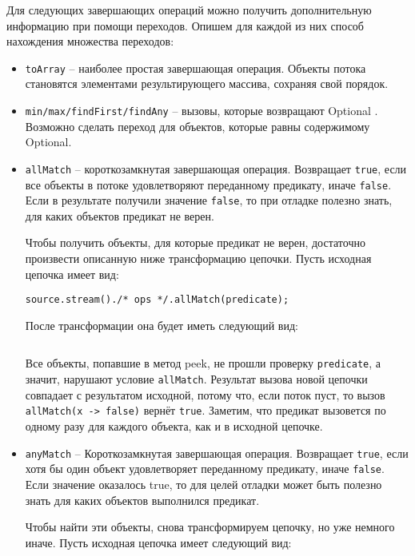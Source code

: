 Для следующих завершающих операций можно получить дополнительную информацию при помощи переходов. Опишем для каждой из них способ нахождения множества переходов:

\begin{itemize}
	\item \texttt{toArray} -- наиболее простая завершающая операция. Объекты потока становятся элементами результирующего массива, сохраняя свой порядок.
	\item \texttt{min/max/findFirst/findAny} -- вызовы, которые возвращают Optional \cite{java:optional}. Возможно сделать переход для объектов, которые равны содержимому Optional.
	\item \texttt{allMatch} -- короткозамкнутая завершающая операция. Возвращает \texttt{true}, если все объекты в потоке удовлетворяют переданному предикату, иначе \texttt{false}. Если в результате получили значение \texttt{false}, то при отладке полезно знать, для каких объектов предикат не верен.
	
	Чтобы получить объекты, для которые предикат не верен, достаточно произвести описанную ниже трансформацию цепочки. Пусть исходная цепочка имеет вид:
	
	\texttt{source.stream()./* ops */.allMatch(predicate);}

	После трансформации она будет иметь следующий вид:
	
	\inputminted{java}{chapter2/code/allMatchTransform.java}
	
	Все объекты, попавшие в метод peek, не прошли проверку \texttt{predicate}, а значит, нарушают условие \texttt{allMatch}. Результат вызова новой цепочки совпадает с результатом исходной, потому что, если поток пуст, то вызов \\ \texttt{allMatch(x -> false)} вернёт \texttt{true}. Заметим, что предикат вызовется по одному разу для каждого объекта, как и в исходной цепочке.
	
	\item \texttt{anyMatch} -- Короткозамкнутая завершающая операция. Возвращает \texttt{true}, если хотя бы один объект удовлетворяет переданному предикату, иначе \texttt{false}. Если значение оказалось true, то для целей отладки может быть полезно знать для каких объектов выполнился предикат.
	
	Чтобы найти эти объекты, снова трансформируем цепочку, но уже немного иначе. Пусть исходная цепочка имеет следующий вид: 
	

\end{itemize}
